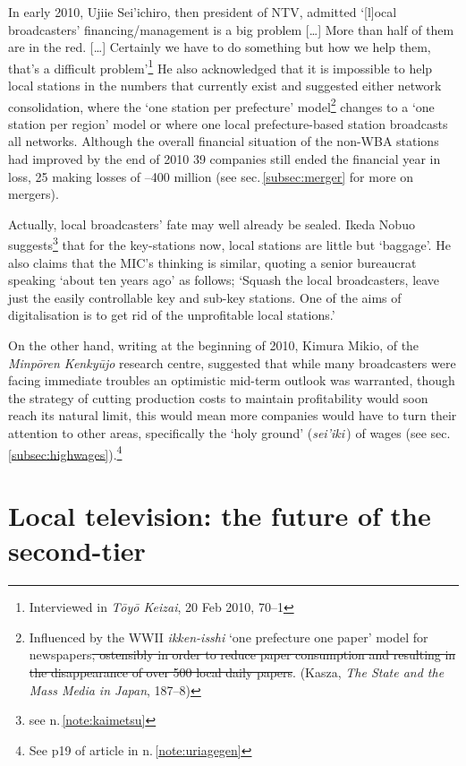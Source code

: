 \documentclass[11pt, oneside, a4paper, headsepline]{scrartcl}
\newcommand{\cjk}[1]{{\fontspec[Scale=0.9]{Hiragino Mincho Pro}#1}}
\newcommand{\ty}{\textyen}
\begin{document}
In early 2010, Ujiie Sei'ichiro, then president of NTV, admitted `[l]ocal broadcasters' financing/management is a big problem [{\ldots}] More than half of them are in the red. [{\ldots}] Certainly we have to do something but how we help them, that's a difficult problem'\footnote{Interviewed in \emph{T\={o}y\={o} Keizai}, 20 Feb 2010, 70--1} He also acknowledged that it is impossible to help local stations in the numbers that currently exist and suggested either network consolidation, where the `one station per prefecture' model\footnote{Influenced by the WWII \emph{ikken-isshi} `one prefecture one paper' model for newspapers\st{, ostensibly in order to reduce paper consumption and resulting in the disappearance of over 500 local daily papers}. (Kasza, \emph{The State and the Mass Media in Japan}, 187--8)}\nocite{Kasza:1988} changes to a `one station per region' model or where one local prefecture-based station broadcasts all networks. Although the overall financial situation of the non-WBA stations had improved by the end of 2010 39 companies still ended the financial year in loss, 25 making losses of \ty100--400 million (see sec.\,\ref{subsec:merger} for more on mergers).%

Actually, local broadcasters' fate may well already be sealed. Ikeda Nobuo suggests\footnote{see n.\,\ref{note:kaimetsu}} that for the key-stations now, local stations are little but `baggage'. He also claims that the MIC's thinking is similar, quoting a senior bureaucrat speaking `about ten years ago' as follows; `Squash the local broadcasters, leave just the easily controllable key and sub-key stations. One of the aims of digitalisation is to get rid of the unprofitable local stations.'

On the other hand, writing at the beginning of 2010, Kimura Mikio, of the \textit{Minp\={o}ren Kenky\={u}jo} research centre, suggested that while many broadcasters were facing immediate troubles an optimistic mid-term outlook was warranted, though the strategy of cutting production costs to maintain profitability would soon reach its natural limit, this would mean more companies would have to turn their attention to other areas, specifically the `holy ground' (\emph{sei'iki}\,) of wages (see sec.\,\ref{subsec:highwages}).\footnote{See p19 of article in n.\,\ref{note:uriagegen}} %

\section{Local television: the future of the second-tier}
\label{local-future}
\end{document}
